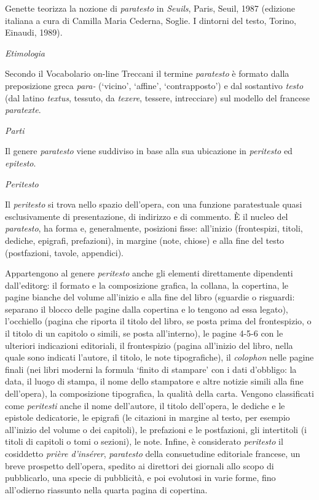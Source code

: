 Genette teorizza la nozione di \emph{paratesto} in \emph{Seuils}, Paris,
Seuil, 1987 (edizione italiana a cura di Camilla Maria Cederna, Soglie.
I dintorni del testo, Torino, Einaudi, 1989).

\emph{Etimologia}

Secondo il Vocabolario on-line Treccani il termine \emph{paratesto} è
formato dalla preposizione greca \emph{para-} (`vicino', `affine',
`contrapposto') e dal sostantivo \emph{testo} (dal latino \emph{textus},
tessuto, da \emph{texere}, tessere, intrecciare) sul modello del
francese \emph{paratexte}.

\emph{Parti}

Il genere \emph{paratesto} viene suddiviso in base alla sua ubicazione
in \emph{peritesto} ed \emph{epitesto}.

\emph{Peritesto}

Il \emph{peritesto} si trova nello spazio dell'opera, con una funzione
paratestuale quasi esclusivamente di presentazione, di indirizzo e di
commento. È il nucleo del \emph{paratesto}, ha forma e, generalmente,
posizioni fisse: all'inizio (frontespizi, titoli, dediche, epigrafi,
prefazioni), in margine (note, chiose) e alla fine del testo
(postfazioni, tavole, appendici).

Appartengono al genere \emph{peritesto} anche gli elementi direttamente
dipendenti dall'editor\href{https://it.wikipedia.org/wiki/Editore}{e}:
il formato e la composizione grafica, la collana, la copertina, le
pagine bianche del volume all'inizio e alla fine del libro (sguardie o
risguardi: separano il blocco delle pagine dalla copertina e lo tengono
ad essa legato), l'occhiello (pagina che riporta il titolo del libro, se
posta prima del frontespizio, o il titolo di un capitolo o simili, se
posta all'interno), le pagine 4-5-6 con le ulteriori indicazioni
editoriali, il frontespizio (pagina all'inizio del libro, nella quale
sono indicati l'autore, il titolo, le note tipografiche), il
\emph{colophon} nelle pagine finali (nei libri moderni la formula
`finito di stampare' con i dati d'obbligo: la data, il luogo di stampa,
il nome dello stampatore e altre notizie simili alla fine dell'opera),
la composizione tipografica, la qualità della carta. Vengono
classificati come \emph{peritesti} anche il nome dell'autore, il titolo
dell'opera, le dediche e le epistole dedicatorie, le epigrafi (le
citazioni in margine al testo, per esempio all'inizio del volume o dei
capitoli), le prefazioni e le postfazioni, gli intertitoli (i titoli di
capitoli o tomi o sezioni), le note. Infine, è considerato
\emph{peritesto} il cosiddetto \emph{prière d'insérer}, \emph{paratesto}
della consuetudine editoriale francese, un breve prospetto dell'opera,
spedito ai direttori dei giornali allo scopo di pubblicarlo, una specie
di pubblicità, e poi evolutosi in varie forme, fino all'odierno
riassunto nella quarta pagina di copertina.

